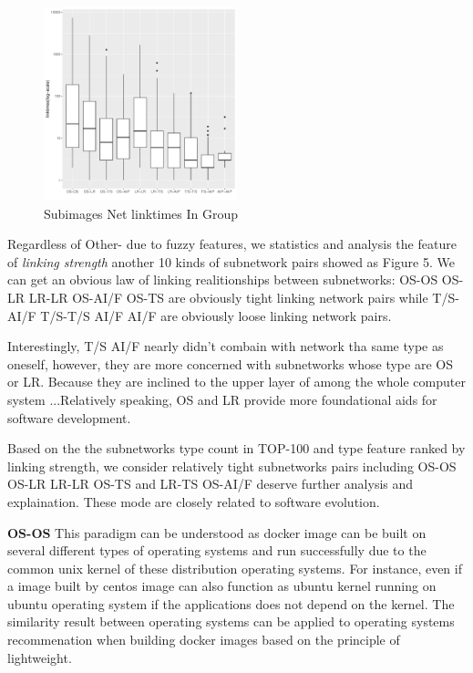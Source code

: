 \documentclass[sigconf]{acmart}
\begin{document}
\begin{figure}[htbp]
\centerline{\includegraphics[width=0.5\textwidth]{picture//typepairs_linktimes.pdf}}
\caption{Subimages Net linktimes In Group}
\label{fig}
\end{figure}


Regardless of Other- due to fuzzy features, we statistics and analysis the feature of \emph{linking strength} another 10 kinds of subnetwork pairs  showed as Figure 5. We can get an obvious law of linking realitionships between subnetworks: OS-OS OS-LR LR-LR OS-AI/F     OS-TS are obviously tight linking network pairs while  T/S-AI/F T/S-T/S AI/F AI/F are obviously loose linking network pairs. 

Interestingly, T/S AI/F nearly didn't combain with network tha same type as oneself, however, they are more concerned with subnetworks whose type are OS or LR.   
Because they are inclined to the upper layer of among the whole computer system ...Relatively speaking, OS and LR provide more foundational aids for software development.





Based on the the subnetworks type count in TOP-100 and type feature ranked by linking strength, we consider relatively tight subnetworks pairs including OS-OS OS-LR LR-LR OS-TS and LR-TS OS-AI/F deserve further analysis and explaination. These mode are closely related to software evolution.


\noindent\textbf{OS-OS }  This paradigm can be understood as docker image can be built on several different types of operating systems and run successfully due to the common unix kernel of these distribution operating systems. For instance, even if a image built by centos image can also function as ubuntu kernel running on ubuntu operating system if the applications does not depend on the kernel. The similarity result between operating systems  can be applied to operating systems recommenation when building docker images based on the principle of lightweight. 
 
\end{document}
